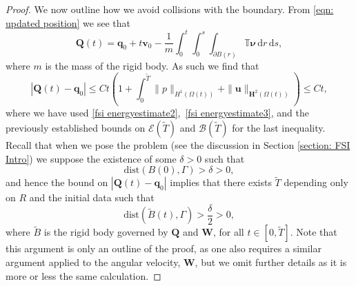 \documentclass[a4paper]{amsart}
\numberwithin{equation}{section}
\theoremstyle{plain}
\newcommand{\mbf}[1]{\mathbf{#1}}
\newcommand{\mbb}[1]{\mathbb{#1}}
\begin{document}
\begin{proof}
    We now outline how we avoid collisions with the boundary.
    From \eqref{eqn: updated position} we see that
    \[\mbf{Q}(t) = \mbf{q}_0 + t\mbf{v}_0- \frac{1}{m}\int_0^t\int_0^s\int_{\partial B(r)} \mbb{T} \boldsymbol{\nu} \, \mathrm{d}r \, \mathrm{d}s,\]
    where $m$ is the mass of the rigid body.
    As such we find that 
    \[ |\mbf{Q}(t) - \mbf{q}_0| \leq Ct\left(1 + \int_{0}^{\widetilde{T}} \|p\|_{H^1(\Omega(t))} + \|\mbf{u}\|_{\mbf{H}^2(\Omega(t))}\right) \leq C t,\]
    where we have used \eqref{fsi energyestimate2},~\eqref{fsi energyestimate3}, and the previously established bounds on $\mathcal{E}(\widetilde{T})$ and $\mathcal{B}(\widetilde{T})$ for the last inequality.
    Recall that when we pose the problem (see the discussion in Section \ref{section: FSI Intro}) we suppose the existence of some $\delta > 0$ such that
	\[ \mathrm{dist}(B(0), \Gamma) > \delta > 0, \]
	and hence the bound on $|\mbf{Q}(t) - \mbf{q}_0|$ implies that there exists $\widetilde{T}$ depending only on $R$ and the initial data such that
	\[ \mathrm{dist}(\widetilde{B}(t), \Gamma) > \frac{\delta}{2} > 0, \]
    where $\widetilde{B}$ is the rigid body governed by $\mbf{Q} $ and $ \mbf{W}$, for all $t \in [0, \widetilde{T}]$.
    Note that this argument is only an outline of the proof, as one also requires a similar argument applied to the angular velocity, $\mbf{W}$, but we omit further details as it is more or less the same calculation.
\end{proof}
\end{document}
